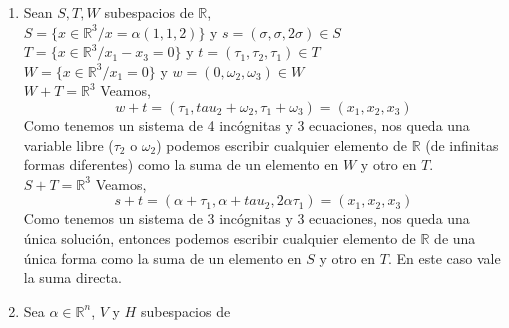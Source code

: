 \documentclass[11pt]{article}
\begin{document}
\begin{enumerate}
        entonces el espacio $S+T$ es $\left[\left(1,1,\frac{1}{3}\right);(2,1,1)\right]$
        \begin{proof}
          Sean $\alpha, \beta \in \mathbb{R}$,\\
          $s = \alpha \left(1,1, \frac{1}{3} \right)\in S$\\
          $t = \beta (2, 1, 1) \in T$\\
          Entonces veamos $s+t \in S+ T$
          \[ s + t = \alpha \left( 1, 1, \frac{1}{3} \right) + \beta (2,1,1)\]
          Un elemento cualquiera de $S+T$ lo escribimos como una combinación lineal
          esos dos vectores entonces $\left(0,1,\frac{1}{3}\right)$ y $(2,1,1)$ es un 
          sistema generador de $S+T$.\\
        \end{proof}
        Podemos escribir $(4,5,-3)$ de la siguiente manera
        \[ (4,5,-3) = 6\left(1,1,\frac{1}{3}\right) -(2,1,1) \]
        El vector $(1, 3, 0)$ no se puede escribir de esta manera porque $\nexists \
        \alpha \beta /$
        \[ (1,3,0) = \alpha \left(1,1,\frac{1}{3}\right) + \beta (2,1,1) \]
    \item Sean $S, T, W$ subespacios de $\mathbb{R}$,\\
      $S=\{x \in \mathbb{R}^3 /x=\alpha (1,1,2)\}$ y $s=(\sigma,\sigma,2\sigma)\in S$\\
      $T=\{x \in \mathbb{R}^3 / x_1-x_3=0\}$ y $t = (\tau_1, \tau_2, \tau_1) \in T$\\
      $W=\{x \in \mathbb{R}^3 / x_1=0\}$ y $w = (0, \omega_2, \omega_3) \in W$\\
      $W+T = \mathbb{R}^3$ Veamos,
      \[ w + t = (\tau_1, tau_2 + \omega_2, \tau_1 + \omega_3) = (x_1, x_2, x_3)\]
      Como tenemos un sistema de 4 incógnitas y 3 ecuaciones, nos queda una variable
      libre ($\tau_2$ o $\omega_2$) podemos escribir cualquier elemento 
      de $\mathbb{R}$ (de infinitas formas diferentes) como la suma de un 
      elemento en $W$ y otro en $T$.\\
      $S+T = \mathbb{R}^3$ Veamos,
      \[ s+t = (\alpha + \tau_1, \alpha + tau_2, 2 \alpha \tau_1) = (x_1, x_2, x_3)\]
      Como tenemos un sistema de 3 incógnitas y 3 ecuaciones, nos queda una única
      solución, entonces podemos escribir cualquier elemento de $\mathbb{R}$
      de una única forma como la suma de un elemento en $S$ y otro en $T$.
      En este caso vale la suma directa.
  \item Sea $\alpha \in \mathbb{R}^n$, $V$ y $H$ subespacios de 

\end{enumerate}
\end{document}
